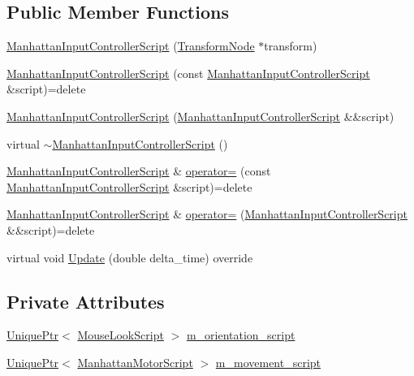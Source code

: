 \subsection*{Public Member Functions}
\begin{DoxyCompactItemize}
\item 
\hyperlink{classmage_1_1_manhattan_input_controller_script_a51b746c88210f1ca07711526cb91ec71}{Manhattan\+Input\+Controller\+Script} (\hyperlink{classmage_1_1_transform_node}{Transform\+Node} $\ast$transform)
\item 
\hyperlink{classmage_1_1_manhattan_input_controller_script_ad16da80362158de342ecf8d669fbbe15}{Manhattan\+Input\+Controller\+Script} (const \hyperlink{classmage_1_1_manhattan_input_controller_script}{Manhattan\+Input\+Controller\+Script} \&script)=delete
\item 
\hyperlink{classmage_1_1_manhattan_input_controller_script_a5e281b4e16a7b1ead6c31ca742d7d79c}{Manhattan\+Input\+Controller\+Script} (\hyperlink{classmage_1_1_manhattan_input_controller_script}{Manhattan\+Input\+Controller\+Script} \&\&script)
\item 
virtual \hyperlink{classmage_1_1_manhattan_input_controller_script_a3cf134df3084aeffc7ac87a066ecb0c4}{$\sim$\+Manhattan\+Input\+Controller\+Script} ()
\item 
\hyperlink{classmage_1_1_manhattan_input_controller_script}{Manhattan\+Input\+Controller\+Script} \& \hyperlink{classmage_1_1_manhattan_input_controller_script_a07fdb2fee8a1eb793c2d54853c9e4998}{operator=} (const \hyperlink{classmage_1_1_manhattan_input_controller_script}{Manhattan\+Input\+Controller\+Script} \&script)=delete
\item 
\hyperlink{classmage_1_1_manhattan_input_controller_script}{Manhattan\+Input\+Controller\+Script} \& \hyperlink{classmage_1_1_manhattan_input_controller_script_acea874b94a4531c393af739824012a1a}{operator=} (\hyperlink{classmage_1_1_manhattan_input_controller_script}{Manhattan\+Input\+Controller\+Script} \&\&script)=delete
\item 
virtual void \hyperlink{classmage_1_1_manhattan_input_controller_script_adfd98377642722fae5db6e005b2c6c3e}{Update} (double delta\+\_\+time) override
\end{DoxyCompactItemize}
\subsection*{Private Attributes}
\begin{DoxyCompactItemize}
\item 
\hyperlink{namespacemage_a8c307fbcc33bce9b7f2aa4c26c3b95cf}{Unique\+Ptr}$<$ \hyperlink{classmage_1_1_mouse_look_script}{Mouse\+Look\+Script} $>$ \hyperlink{classmage_1_1_manhattan_input_controller_script_add3be278d93719ba235d4606d555bd2a}{m\+\_\+orientation\+\_\+script}
\item 
\hyperlink{namespacemage_a8c307fbcc33bce9b7f2aa4c26c3b95cf}{Unique\+Ptr}$<$ \hyperlink{classmage_1_1_manhattan_motor_script}{Manhattan\+Motor\+Script} $>$ \hyperlink{classmage_1_1_manhattan_input_controller_script_ad3b6525bba021f03c17d2de6f5e54101}{m\+\_\+movement\+\_\+script}
\end{DoxyCompactItemize}

